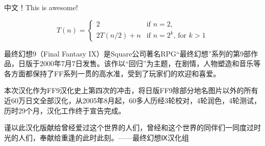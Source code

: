 \documentclass[12pt,a4paper]{article}
\begin{document}
中文！This is awesome!


\begin{equation*}
T(n) = \left\{
  \begin{array}{ll}
    2         & \text{if $n=2$,}\\
    2T(n/2)+n & \text{if $n=2^k$, for $k>1$}
  \end{array}
\right.
\end{equation*}

最终幻想9（Final Fantasy IX）是Square公司著名RPG“最终幻想”系列的第9部作品，日版于2000年7月7日发售。该作以“回归”为主题，在剧情，人物塑造和音乐等各方面都保持了FF系列一贯的高水准，受到了玩家们的欢迎和喜爱。

本次汉化作为FF9汉化史上第四次的冲击，将日版FF9除部分地名图片以外的所有近60万日文全部汉化，从2005年8月起，60多人历经3轮校对，4轮润色，4轮测试，历时29个月，汉化工作终于宣告完成。

谨以此汉化版献给曾经爱过这个世界的人们，曾经和这个世界的同伴们一同度过时光的人们，奉献给重逢的此时此刻。——最终幻想Ⅸ汉化组
\end{document}
